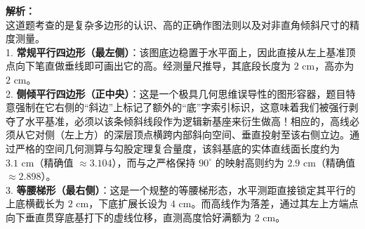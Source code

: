 \begin{center}
\end{center}

\vspace{0.8cm}

{\small\color{gray}
\textbf{解析：}\\
这道题考查的是复杂多边形的认识、高的正确作图法则以及对非直角倾斜尺寸的精度测量。\\
1. \textbf{常规平行四边形（最左侧）}：该图底边稳置于水平面上，因此直接从左上基准顶点向下笔直做垂线即可画出它的高。经测量尺推导，其底段长度为 $2\text{ cm}$，高亦为 $2\text{ cm}$。\\
2. \textbf{侧倾平行四边形（正中央）}：这是一个极具几何思维误导性的图形容器，题目特意强制在它右侧的“斜边”上标记了额外的“底”字索引标识，这意味着我们被强行剥夺了水平基准，必须以该条倾斜线段作为逻辑新基座来衍生做高！相应的，高线必须从它对侧（左上方）的深层顶点横跨内部斜向空间、垂直投射至该右侧立边。通过严格的空间几何测算与勾股定理复合量度，该斜基底的实体直线面长度约为 $3.1\text{ cm}$（精确值 $\approx 3.104$），而与之严格保持 $90^\circ$ 的映射高则约为 $2.9\text{ cm}$（精确值 $\approx 2.898$）。\\
3. \textbf{等腰梯形（最右侧）}：这是一个规整的等腰梯形态，水平测距直接锁定其平行的上底横截长为 $2\text{ cm}$，下底扩展长设为 $4\text{ cm}$。而高线作为落差，通过其左上方端点向下垂直贯穿底基打下的虚线位移，直测高度恰好满额为 $2\text{ cm}$。
}

\vspace{0.6cm}

